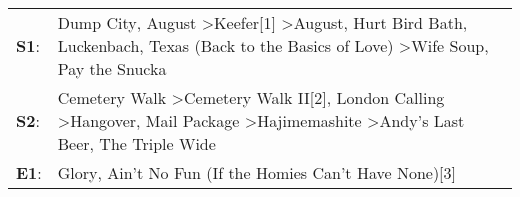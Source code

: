 \begin{supertabular}{p{0.03\textwidth}p{0.92\textwidth}}
 \textbf{S1}:  &           Dump City\textsuperscript{}, \enspace August\textsuperscript{} \textgreater \enspace Keefer[1]\textsuperscript{} \textgreater \enspace August\textsuperscript{}, \enspace Hurt Bird Bath\textsuperscript{}, \enspace Luckenbach, Texas (Back to the Basics of Love)\textsuperscript{} \textgreater \enspace Wife Soup\textsuperscript{}, \enspace Pay the Snucka\textsuperscript{}  \enspace  \\
 \textbf{S2}:  &  Cemetery Walk\textsuperscript{} \textgreater \enspace Cemetery Walk II[2]\textsuperscript{}, \enspace London Calling\textsuperscript{} \textgreater \enspace Hangover\textsuperscript{}, \enspace Mail Package\textsuperscript{} \textgreater \enspace Hajimemashite\textsuperscript{} \textgreater \enspace Andy's Last Beer\textsuperscript{}, \enspace The Triple Wide\textsuperscript{}  \enspace  \\
 \textbf{E1}:  &                                                                                                                                                                                                                                                                                          Glory\textsuperscript{}, \enspace Ain't No Fun (If the Homies Can't Have None)[3]\textsuperscript{}  \enspace  \\
\end{supertabular}
